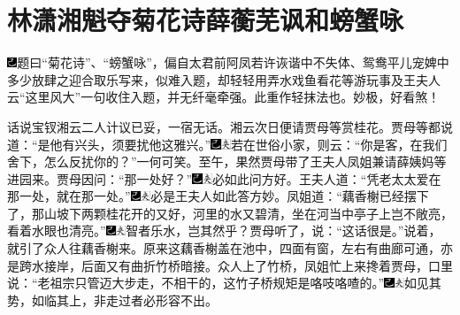 

\chapter{林潇湘魁夺菊花诗\hspace{.5em}薛蘅芜讽和螃蟹咏}

{\includegraphics[width=3mm]{../Images/00003}题曰``菊花诗''、``螃蟹咏''，偏自太君前阿凤若许诙谐中不失体、鸳鸯平儿宠婢中多少放肆之迎合取乐写来，似难入题，却轻轻用弄水戏鱼看花等游玩事及王夫人云``这里风大''一句收住入题，并无纤毫牵强。此重作轻抹法也。妙极，好看煞！}

话说宝钗湘云二人计议已妥，一宿无话。湘云次日便请贾母等赏桂花。贾母等都说道：``是他有兴头，须要扰他这雅兴。''{\includegraphics[width=3mm]{../Images/00003}\includegraphics[width=3mm]{../Images/00012}\footnotesize \kaishu 若在世俗小家，则云：``你是客，在我们舍下，怎么反扰你的？''一何可笑。}至午，果然贾母带了王夫人凤姐兼请薛姨妈等进园来。贾母因问：``那一处好？''{\includegraphics[width=3mm]{../Images/00003}\includegraphics[width=3mm]{../Images/00012}\footnotesize \kaishu 必如此问方好。}王夫人道：``凭老太太爱在那一处，就在那一处。''{\includegraphics[width=3mm]{../Images/00003}\includegraphics[width=3mm]{../Images/00012}\footnotesize \kaishu 必是王夫人如此答方妙。}凤姐道：``藕香榭已经摆下了，那山坡下两颗桂花开的又好，河里的水又碧清，坐在河当中亭子上岂不敞亮，看着水眼也清亮。''{\includegraphics[width=3mm]{../Images/00003}\includegraphics[width=3mm]{../Images/00012}\footnotesize \kaishu 智者乐水，岂其然乎？}贾母听了，说：``这话很是。''说着，就引了众人往藕香榭来。原来这藕香榭盖在池中，四面有窗，左右有曲廊可通，亦是跨水接岸，后面又有曲折竹桥暗接。众人上了竹桥，凤姐忙上来搀着贾母，口里说：``老祖宗只管迈大步走，不相干的，这竹子桥规矩是咯吱咯喳的。''{\includegraphics[width=3mm]{../Images/00003}\includegraphics[width=3mm]{../Images/00012}\footnotesize \kaishu 如见其势，如临其上，非走过者必形容不出。}

